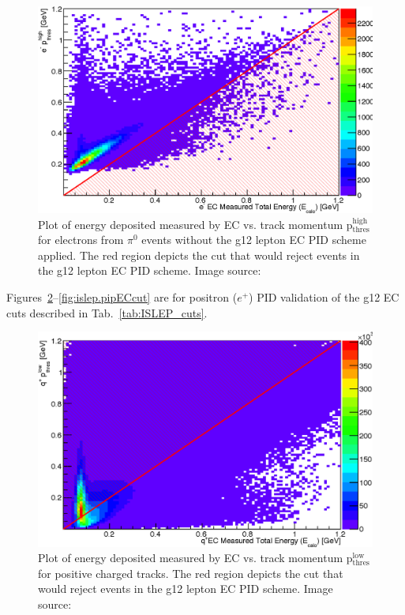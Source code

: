 \begin{figure}\begin{center}
							\includegraphics[width=0.8\figwidth]{figures/lepton/Pim_EChighcut.eps}
							\caption[EC Deposited Energy Comparison to Track Momentum for $e^-$ from $\pi^0$ Events]{\label{fig:islep.pimECcut}Plot of energy deposited measured by EC vs. track momentum p$\mathrm{_{thres}^{high}}$ for electrons from $\pi^0$ events without the g12 lepton EC PID scheme applied. The red region depicts the cut that would reject events in the g12 lepton EC PID scheme. Image source:~\cite{thesiskunkel}}
\end{center}\end{figure}
						
Figures~\ref{fig:islep.pipEClow}--\ref{fig:islep.pipECcut} are for positron ($e^+$) PID validation of the g12 EC cuts described in Tab.~\ref{tab:ISLEP_cuts}.
						
\begin{figure}\begin{center}
								\includegraphics[width=0.8\figwidth]{figures/lepton/Pip_EClow.eps}
								\caption[EC Deposited Energy Comparison to Lower Threshold Track Momentum for q$^+$ Tracks]{\label{fig:islep.pipEClow}Plot of energy deposited measured by EC vs. track momentum p$\mathrm{_{thres}^{low}}$ for positive charged tracks. The red region depicts the cut that would reject events in the g12 lepton EC PID scheme. Image source:~\cite{thesiskunkel}}
\end{center}\end{figure}
							
